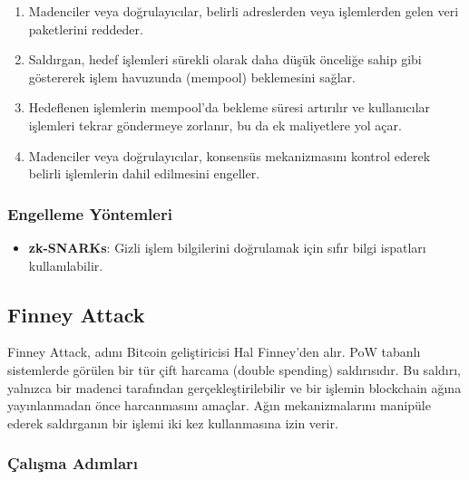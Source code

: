 \begin{enumerate}
    \item Madenciler veya doğrulayıcılar, belirli adreslerden veya işlemlerden gelen veri paketlerini reddeder.
    \item Saldırgan, hedef işlemleri sürekli olarak daha düşük önceliğe sahip gibi göstererek işlem havuzunda (mempool) beklemesini sağlar.
    \item Hedeflenen işlemlerin mempool'da bekleme süresi artırılır ve kullanıcılar işlemleri tekrar göndermeye zorlanır, bu da ek maliyetlere yol açar.
    \item Madenciler veya doğrulayıcılar, konsensüs mekanizmasını kontrol ederek belirli işlemlerin dahil edilmesini engeller.
\end{enumerate}

\subsubsection{Engelleme Yöntemleri}

\begin{itemize}
    \item \textbf{zk-SNARKs}: Gizli işlem bilgilerini doğrulamak için sıfır bilgi ispatları kullanılabilir.
\end{itemize}

\newpage

\subsection{Finney Attack}

Finney Attack, adını Bitcoin geliştiricisi Hal Finney'den alır. PoW tabanlı sistemlerde görülen bir tür çift harcama (double spending) saldırısıdır. Bu saldırı, yalnızca bir madenci tarafından gerçekleştirilebilir ve bir işlemin blockchain ağına yayınlanmadan önce harcanmasını amaçlar. Ağın mekanizmalarını manipüle ederek saldırganın bir işlemi iki kez kullanmasına izin verir.

\subsubsection{Çalışma Adımları}

